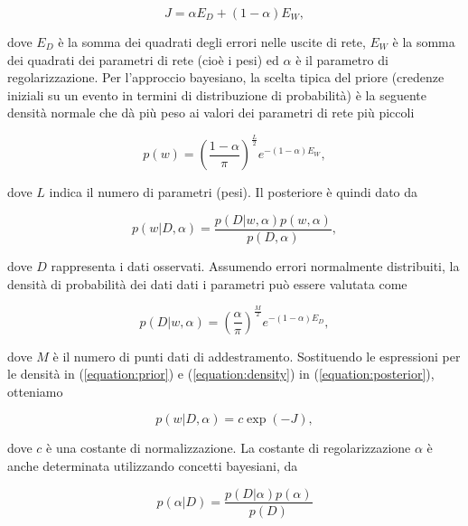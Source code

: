 \documentclass[12pt,a4paper]{report}
\begin{document}
\begin{equation}
{\displaystyle J =\alpha E_D + (1 - \alpha)E_W},
\end{equation}

dove $E_D$ è la somma dei quadrati degli errori nelle uscite di rete, $E_W$ è la somma dei quadrati dei parametri di rete (cioè i pesi) ed $\alpha$ è il parametro di regolarizzazione.
Per l'approccio bayesiano, la scelta tipica del priore (credenze iniziali su un evento in termini di distribuzione di probabilità) è la seguente densità normale che dà più peso ai valori dei parametri di rete più piccoli

\begin{equation}
{\displaystyle p(w) = \left( \frac{1 - \alpha}{\pi} \right)^{\frac{L}{2}} e^{-(1 - \alpha)E_W}},
\label{equation:prior}
\end{equation}

dove $L$ indica il numero di parametri (pesi). Il posteriore è quindi dato da

\begin{equation}
{ \displaystyle p(w \vert D, \alpha) = \frac{p(D \vert w, \alpha)p(w, \alpha)}{p(D, \alpha)} },
\label{equation:posterior}
\end{equation}

dove $D$ rappresenta i dati osservati. Assumendo errori normalmente distribuiti, la densità di probabilità dei dati dati i parametri può essere valutata come

\begin{equation}
{ \displaystyle p(D \vert w, \alpha) = \left( \frac{\alpha}{\pi} \right)^{\frac{M}{2}}  e^{-(1 - \alpha)E_D} },
\label{equation:density}
\end{equation}

dove $M$ è il numero di punti dati di addestramento. Sostituendo le espressioni per le densità in (\ref{equation:prior}) e (\ref{equation:density}) in (\ref{equation:posterior}), otteniamo

\begin{equation}
{ \displaystyle p(w \vert D, \alpha) = c \exp(-J) },
\label{equation:sostitution}
\end{equation}

dove $c$ è una costante di normalizzazione. La costante di regolarizzazione $\alpha$ è anche determinata utilizzando concetti bayesiani, da

\begin{equation}
{ \displaystyle p(\alpha \vert D) = \frac{p(D \vert \alpha)p(\alpha)}{p(D)} }
\label{equation:constant}
\end{equation}
\end{document}
